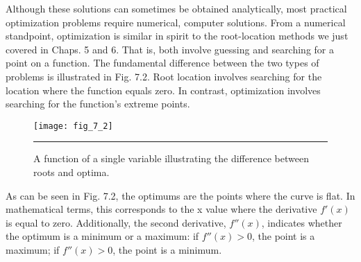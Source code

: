 \documentclass[../main.tex]{subfiles}
\begin{document}
Although these solutions can sometimes be obtained analytically, most practical
optimization problems require numerical, computer solutions. From a numerical standpoint,
optimization is similar in spirit to the root-location methods we just covered in
Chaps. 5 and 6. That is, both involve guessing and searching for a point on a function. The
fundamental difference between the two types of problems is illustrated in Fig. 7.2. Root
location involves searching for the location where the function equals zero. In contrast,
optimization involves searching for the function's extreme points.

\begin{figure}[H]
	\centering
	\texttt{[image: fig\_7\_2]}
	\caption{\textsf{A function of a single variable illustrating the difference between roots and optima.}}
	\color{cyan} \rule{\linewidth}{0,5mm}
	\label{fig:fig_7_2}
\end{figure}

As can be seen in Fig. 7.2, the optimums are the points where the curve is flat. In mathematical
terms, this corresponds to the x value where the derivative $f'(x)$ is equal to zero. Additionally, the second derivative,
$f''(x)$, indicates whether the optimum is a minimum or a maximum: if $f''(x) > 0$, 
the point is a maximum; if $f''(x) > 0$, the point is a minimum.
\end{document}

